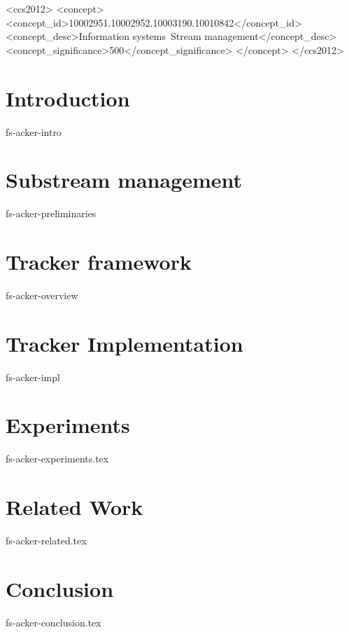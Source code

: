 \documentclass[sigconf]{acmart}
\newcommand {\tracker} {trAcker}
\begin{document}
\begin{CCSXML}
<ccs2012>
<concept>
<concept_id>10002951.10002952.10003190.10010842</concept_id>
<concept_desc>Information systems~Stream management</concept_desc>
<concept_significance>500</concept_significance>
</concept>
</ccs2012>
\end{CCSXML}



\maketitle


\thispagestyle{empty}

\section {Introduction}
 {fs-acker-intro}

\section{Substream management}
 {fs-acker-preliminaries}

\section{Tracker framework}
 {fs-acker-overview}

\section{Tracker Implementation}
 {fs-acker-impl}

\section {Experiments}
 {fs-acker-experiments.tex}

\section{Related Work}
 {fs-acker-related.tex}

\section {Conclusion}
 {fs-acker-conclusion.tex}



% 

\end{document}
